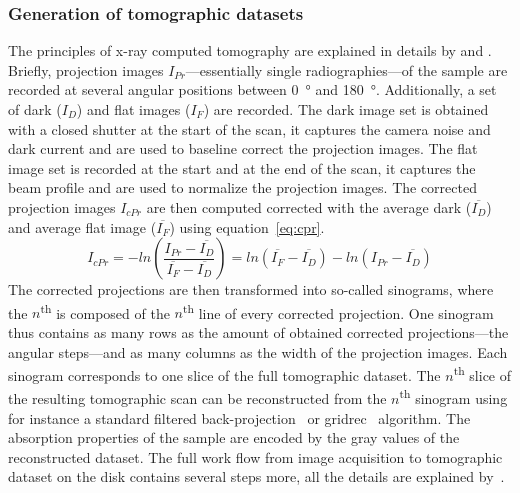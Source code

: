 \subsubsection{Generation of tomographic datasets}
The principles of x-ray computed tomography are explained in details by \citet{Kak2002} and \citet{Hsieh2003}. Briefly, projection images $I_{Pr}$---essentially single radiographies---of the sample are recorded at several angular positions between \SI{0}{\degree} and \SI{180}{\degree}. Additionally, a set of dark ($I_{D}$) and flat images ($I_{F}$) are recorded. The dark image set is obtained with a closed shutter at the start of the scan, it captures the camera noise and dark current and are used to baseline correct the projection images. The flat image set is recorded at the start and at the end of the scan, it captures the beam profile and are used to normalize the projection images. The corrected projection images $I_{cPr}$ are then computed corrected with the average dark ($\overline{I_{D}}$) and average flat image ($\overline{I_{F}}$) using equation~\ref{eq:cpr}.
\begin{equation}
	I_{cPr} = -ln\left(\frac{I_{Pr}-\overline{I_{D}}}{\overline{I_{F}}-\overline{I_{D}}}\right)
	        = ln(\overline{I_{F}}-\overline{I_{D}})-ln(I_{Pr}-\overline{I_{D}})
	\label{eq:cpr}
\end{equation}
The corrected projections are then transformed into so-called sinograms, where the $n$\textsuperscript{th} is composed of the $n$\textsuperscript{th} line of every corrected projection. One sinogram thus contains as many rows as the amount of obtained corrected projections---the angular steps---and as many columns as the width of the projection images. Each sinogram corresponds to one slice of the full tomographic dataset. The $n$\textsuperscript{th} slice of the resulting tomographic scan can be reconstructed from the $n$\textsuperscript{th} sinogram using for instance a standard filtered back-projection~\cite{Kak2002,Hsieh2003} or gridrec~\cite{Dowd1999} algorithm. The absorption properties of the sample are encoded by the gray values of the reconstructed dataset. The full work flow from image acquisition to tomographic dataset on the disk contains several steps more, all the details are explained by~\citet{Hintermueller2009}.

